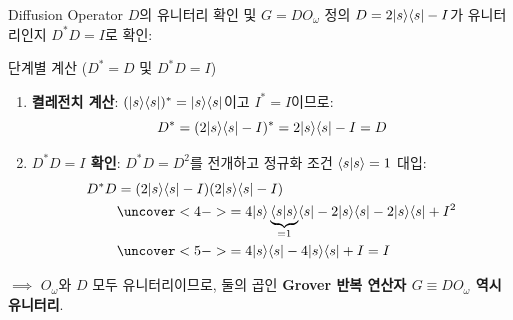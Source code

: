 \documentclass[aspectratio=169, 10pt]{beamer}
\begin{document}
\begin{frame}{Diffusion Operator $D$의 유니터리 확인 및 $G = DO_\omega$ 정의}
    $D = 2|s\rangle\langle s| - I$가 유니터리인지 $D^* D = I$로 확인:
    \pause
    \vspace{0.08cm}
    \begin{qcblock}{단계별 계산 ($D^* = D$ 및 $D^* D = I$)}
        \begin{enumerate}
            \item \textbf{켤레전치 계산}: $(|s\rangle\langle s|)^* = |s\rangle\langle s|$이고 $I^* = I$이므로:
            $$D^* = (2|s\rangle\langle s| - I)^* = 2|s\rangle\langle s| - I = D$$
            \pause
            \item \textbf{$D^* D = I$ 확인}: $D^* D = D^2$를 전개하고 정규화 조건 $\langle s|s\rangle = 1$ 대입:
            \begin{align*}
                D^* D &= (2\ket{s}\bra{s} - I)(2\ket{s}\bra{s} - I) \\
                &\uncover<4->{= 4\ket{s}\underbrace{\braket{s}{s}}_{=1}\bra{s} - 2\ket{s}\bra{s} - 2\ket{s}\bra{s} + I^2} \\
                &\uncover<5->{= 4\ket{s}\bra{s} - 4\ket{s}\bra{s} + I = I}
            \end{align*}
        \end{enumerate}
    \end{qcblock}
    \pause[6]
    $\implies$ $O_\omega$와 $D$ 모두 유니터리이므로, 둘의 곱인 \textbf{Grover 반복 연산자 $G \equiv D O_\omega$ 역시 유니터리}.
\end{frame}
\end{document}
